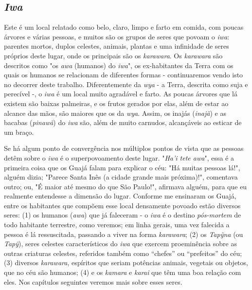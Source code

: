 \hypertarget{iwa}{%
\subsection{\texorpdfstring{\emph{Iwa}}{Iwa}}\label{iwa}}

Este é um local relatado como belo, claro, limpo e farto em comida, com
poucas árvores e várias pessoas, e muitos são os grupos de seres que
povoam o \emph{iwa}: parentes mortos, duplos celestes, animais, plantas
e uma infinidade de seres próprios deste lugar, onde os principais são
os \emph{karawara}. Os \emph{karawara} são descritos como "os \emph{awa}
(humanos) do \emph{iwa}", os ex-habitantes da Terra com os quais os
humanos se relacionam de diferentes formas - continuaremos vendo isto no
decorrer deste trabalho. Diferentemente da \emph{wya} - a Terra,
descrita como suja e perecível -, o \emph{iwa} é um local muito
agradável e farto. As poucas árvores que lá existem são baixas
palmeiras, e os frutos gerados por elas, além de estar ao alcance das
mãos, são maiores que os da \emph{wya}. Assim, os inajás (\emph{inajã})
e as bacabas (\emph{pinawã}) do \emph{iwa} são, além de muito carnudos,
alcançáveis ao esticar de um braço.

Se há algum ponto de convergência nos múltiplos pontos de vista que as
pessoas detêm sobre o \emph{iwa} é o superpovoamento deste lugar.
"\emph{Ha'i tete awa}", essa é a primeira coisa que os Guajá falam para
explicar o céu: "Há muitas pessoas lá!", alguém dizia; "Parece Santa
Inês (a cidade grande mais próxima)!", comentava outro; ou, "É maior até
mesmo do que São Paulo!", afirmava alguém, para que eu realmente
entendesse a dimensão do lugar. Conforme me ensinaram os Guajá, entre os
habitantes que compõem esse local densamente povoado estão diversos
seres: (1) os humanos (\emph{awa}) que já faleceram - o \emph{iwa} é o
destino \emph{pós-mortem} de todo habitante terrestre, como veremos; em
linha gerais, uma vez falecida a pessoa é lá ressuscitada, passando a
viver na forma \emph{karawara}; (2) os \emph{Tapỹna} (ou \emph{Tapỹ}),
seres celestes característicos do \emph{iwa} que exercem proeminência
sobre as outras criaturas celestes, referidos também como ``chefes'' ou
``prefeitos'' do céu; (3) diversos \emph{karawara}, espíritos que seriam
potências animais, vegetais ou objetos, que no céu são humanos; (4) e os
\emph{kamara} e \emph{karai} que têm uma boa relação com eles. Nos
capítulos seguintes veremos mais sobre esses seres.

